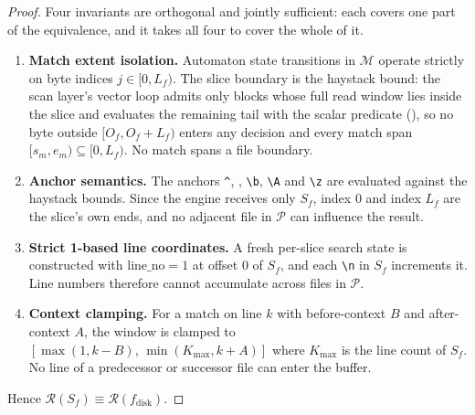 \documentclass[11pt,letterpaper]{article}
\begin{document}
\begin{proof}
Four invariants are orthogonal and jointly sufficient: each covers one part of
the equivalence, and it takes all four to cover the whole of it.
\begin{enumerate}[leftmargin=*,itemsep=1pt,topsep=2pt]
\item \textbf{Match extent isolation.} Automaton state transitions in
  $\mathcal{M}$ operate strictly on byte indices $j\in[0,L_f)$. The slice
  boundary is the haystack bound: the scan layer's vector loop admits only
  blocks whose full read window lies inside the slice and evaluates the
  remaining tail with the scalar predicate (), so no byte
  outside $[O_f,O_f+L_f)$ enters any decision and every match span
  $[s_m,e_m)\subseteq[0,L_f)$. No match spans a file boundary.
\item \textbf{Anchor semantics.} The anchors
  \texttt{\textasciicircum}, \texttt{\textdollar},
  \texttt{\textbackslash b}, \texttt{\textbackslash A} and
  \texttt{\textbackslash z} are evaluated against the haystack bounds. Since
  the engine receives only $S_f$, index $0$ and index $L_f$ are the slice's
  own ends, and no adjacent file in $\mathcal{P}$ can influence the result.
\item \textbf{Strict 1-based line coordinates.} A fresh per-slice search
  state is constructed with $\text{line\_no}=1$ at offset $0$ of $S_f$, and
  each \texttt{\textbackslash n} in $S_f$ increments it. Line numbers
  therefore cannot accumulate across files in $\mathcal{P}$.
\item \textbf{Context clamping.} For a match on line $k$ with before-context
  $B$ and after-context $A$, the window is clamped to
  $[\max(1,k-B),\,\min(K_{\max},k+A)]$ where $K_{\max}$ is the line count of
  $S_f$. No line of a predecessor or successor file can enter the buffer.
\end{enumerate}
Hence $\mathcal{R}(S_f)\equiv\mathcal{R}(f_{\text{disk}})$.
\end{proof}
\end{document}
